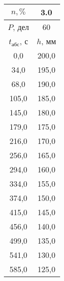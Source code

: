 \begin{tabular}[t]{|c|c|}
\hline
$n, \%$ & 3.0 \\
\hline
$P$, дел & 60 \\
\hline
$t_{абс}$, с & $h$, мм \\ 
\hline
0,0 & 200,0 \\ 
34,0 & 195,0 \\ 
68,0 & 190,0 \\ 
105,0 & 185,0 \\ 
145,0 & 180,0 \\ 
179,0 & 175,0 \\ 
216,0 & 170,0 \\ 
256,0 & 165,0 \\ 
294,0 & 160,0 \\ 
334,0 & 155,0 \\ 
374,0 & 150,0 \\ 
415,0 & 145,0 \\ 
456,0 & 140,0 \\ 
499,0 & 135,0 \\ 
541,0 & 130,0 \\ 
585,0 & 125,0 \\ 
\hline
\end{tabular}